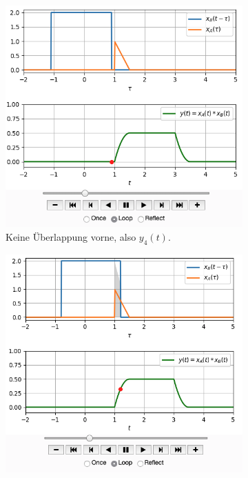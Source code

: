 \begin{figure}[h!]
\centering
\begin{subfigure}{0.45\textwidth}
\centering
\includegraphics[width=\textwidth]{../convolution_ct/conv_var2_4_1D3D68B312.png}
\caption{Keine Überlappung vorne, also $y_4(t)$.}
\label{fig:1D3D68B312_v2_4}
\end{subfigure}
\begin{subfigure}{0.45\textwidth}
\centering
\includegraphics[width=\textwidth]{../convolution_ct/conv_var2_1_1D3D68B312.png}

\end{subfigure}
\end{figure}

